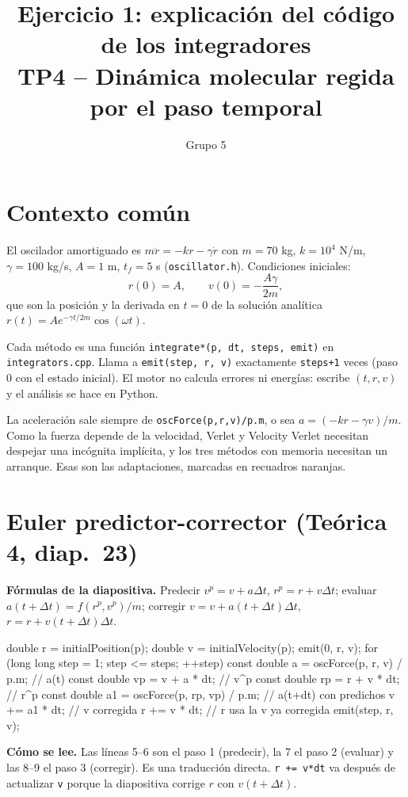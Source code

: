 \documentclass[11pt,a4paper]{article}
\title{Ejercicio 1: explicación del código de los integradores\\\large TP4 -- Dinámica molecular regida por el paso temporal}
\author{Grupo 5}
\date{}
\begin{document}
\maketitle

\section{Contexto común}
El oscilador amortiguado es $m\ddot r=-k r-\gamma\dot r$ con $m=70$ kg, $k=10^4$ N/m, $\gamma=100$ kg/s, $A=1$ m, $t_f=5$ s (\texttt{oscillator.h}). Condiciones iniciales:
\[ r(0)=A,\qquad v(0)=-\frac{A\gamma}{2m}, \]
que son la posición y la derivada en $t=0$ de la solución analítica $r(t)=Ae^{-\gamma t/2m}\cos(\omega t)$.

Cada método es una función \texttt{integrate*(p, dt, steps, emit)} en \texttt{integrators.cpp}. Llama a \texttt{emit(step, r, v)} exactamente \texttt{steps+1} veces (paso 0 con el estado inicial). El motor no calcula errores ni energías: escribe $(t,r,v)$ y el análisis se hace en Python.

La aceleración sale siempre de \texttt{oscForce(p,r,v)/p.m}, o sea $a=(-kr-\gamma v)/m$. Como la fuerza depende de la velocidad, Verlet y Velocity Verlet necesitan despejar una incógnita implícita, y los tres métodos con memoria necesitan un arranque. Esas son las adaptaciones, marcadas en recuadros naranjas.

\section{Euler predictor-corrector (Teórica 4, diap.~23)}
\textbf{Fórmulas de la diapositiva.} Predecir $v^p=v+a\Delta t$, $r^p=r+v\Delta t$; evaluar $a(t+\Delta t)=f(r^p,v^p)/m$; corregir $v=v+a(t+\Delta t)\Delta t$, $r=r+v(t+\Delta t)\Delta t$.

\begin{code}
double r = initialPosition(p);  double v = initialVelocity(p);
emit(0, r, v);
for (long long step = 1; step <= steps; ++step) {
    const double a  = oscForce(p, r, v) / p.m;      // a(t)
    const double vp = v + a * dt;                   // v^p
    const double rp = r + v * dt;                   // r^p
    const double a1 = oscForce(p, rp, vp) / p.m;    // a(t+dt) con predichos
    v += a1 * dt;                                   // v corregida
    r += v * dt;                                    // r usa la v ya corregida
    emit(step, r, v);
}
\end{code}
\textbf{Cómo se lee.} Las líneas 5--6 son el paso 1 (predecir), la 7 el paso 2 (evaluar) y las 8--9 el paso 3 (corregir). Es una traducción directa. \texttt{r += v*dt} va después de actualizar \texttt{v} porque la diapositiva corrige $r$ con $v(t+\Delta t)$.
\end{document}
